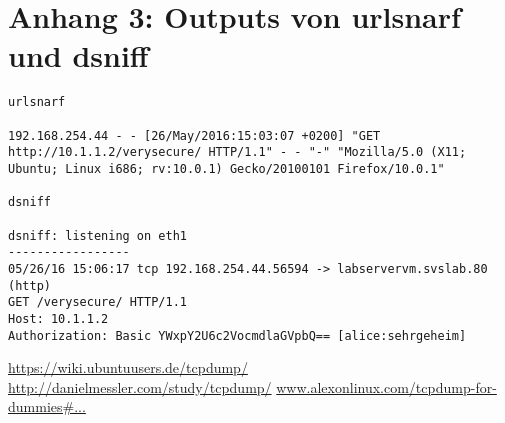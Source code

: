 \documentclass[twoside]{article}
\begin{document}
\section*{Anhang 3: Outputs von urlsnarf und dsniff}
\begin{lstlisting}
urlsnarf

192.168.254.44 - - [26/May/2016:15:03:07 +0200] "GET http://10.1.1.2/verysecure/ HTTP/1.1" - - "-" "Mozilla/5.0 (X11; Ubuntu; Linux i686; rv:10.0.1) Gecko/20100101 Firefox/10.0.1"

dsniff

dsniff: listening on eth1
-----------------
05/26/16 15:06:17 tcp 192.168.254.44.56594 -> labservervm.svslab.80 (http)
GET /verysecure/ HTTP/1.1
Host: 10.1.1.2
Authorization: Basic YWxpY2U6c2VocmdlaGVpbQ== [alice:sehrgeheim] 
\end{lstlisting}

\begin{thebibliography}{1}
		\url{https://wiki.ubuntuusers.de/tcpdump/}
		\url{http://danielmessler.com/study/tcpdump/}
			\url{www.alexonlinux.com/tcpdump-for-dummies\#...}
\end{thebibliography}
\end{document}
